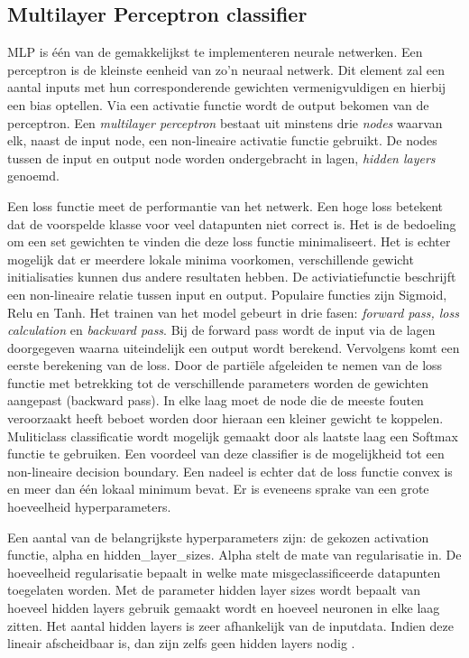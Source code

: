 \subsection{Multilayer Perceptron classifier}

MLP is één van de gemakkelijkst te implementeren neurale netwerken.
Een perceptron is de kleinste eenheid van zo'n neuraal netwerk. Dit element zal een aantal inputs met hun corresponderende gewichten vermenigvuldigen en hierbij een bias optellen. Via een activatie functie wordt de output bekomen van de perceptron. Een \textit{multilayer perceptron} bestaat uit minstens drie \textit{nodes} waarvan elk, naast de input node, een non-lineaire activatie functie gebruikt. De nodes tussen de input en output node worden ondergebracht in lagen, \textit{hidden layers} genoemd.

Een loss functie meet de performantie van het netwerk. Een hoge loss betekent dat de voorspelde klasse voor veel datapunten niet correct is. Het is de bedoeling om een set gewichten te vinden die deze loss functie minimaliseert. Het is echter mogelijk dat er meerdere lokale minima voorkomen, verschillende gewicht initialisaties kunnen dus andere resultaten hebben.
De activiatiefunctie beschrijft een non-lineaire relatie tussen input en output. Populaire functies zijn Sigmoid, Relu en Tanh. Het trainen van het model gebeurt in drie fasen: \textit{forward pass, loss calculation} en \textit{backward pass}. Bij de forward pass wordt de input via de lagen doorgegeven waarna uiteindelijk een output wordt berekend. Vervolgens komt een eerste berekening van de loss. Door de partiële afgeleiden te nemen van de loss functie met betrekking tot de verschillende parameters worden de gewichten aangepast (backward pass). In elke laag moet de node die de meeste fouten veroorzaakt heeft beboet worden door hieraan een kleiner gewicht te koppelen.
Muliticlass classificatie wordt mogelijk gemaakt door als laatste laag een Softmax functie te gebruiken.
Een voordeel van deze classifier is de mogelijkheid tot een non-lineaire decision boundary.
Een nadeel is echter dat de loss functie convex is en meer dan één lokaal minimum bevat. Er is eveneens sprake van een grote hoeveelheid hyperparameters. 

Een aantal van de belangrijkste hyperparameters zijn: de gekozen activation functie, alpha en hidden\_layer\_sizes. Alpha stelt de mate van regularisatie in. De hoeveelheid regularisatie bepaalt in welke mate misgeclassificeerde datapunten toegelaten worden.
Met de parameter hidden layer sizes wordt bepaalt van hoeveel hidden layers gebruik gemaakt wordt en hoeveel neuronen in elke laag zitten. Het aantal hidden layers is zeer afhankelijk van de inputdata. Indien deze lineair afscheidbaar is, dan zijn zelfs geen hidden layers nodig \cite{ref43} \cite{ref44} \cite{ref45} \cite{ref46}.

